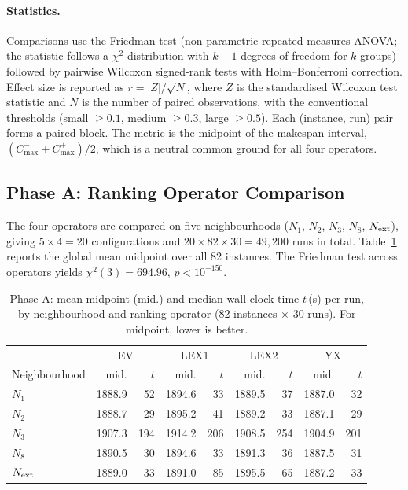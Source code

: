\documentclass[preprint,12pt]{elsarticle}
\begin{document}
\paragraph{Statistics.} Comparisons use the Friedman test (non-parametric repeated-measures ANOVA; the statistic follows a $\chi^2$ distribution with $k-1$ degrees of freedom for $k$ groups) followed by pairwise Wilcoxon signed-rank tests with Holm--Bonferroni correction. Effect size is reported as $r = |Z| / \sqrt{N}$, where $Z$ is the standardised Wilcoxon test statistic and $N$ is the number of paired observations, with the conventional thresholds (small $\geq 0.1$, medium $\geq 0.3$, large $\geq 0.5$). Each (instance, run) pair forms a paired block. The metric is the midpoint of the makespan interval, $(C^-_{\max} + C^+_{\max})/2$, which is a neutral common ground for all four operators.

\subsection{Phase A: Ranking Operator Comparison}
\label{sec6.2}

The four operators are compared on five neighbourhoods ($N_1$, $N_2$, $N_3$, $N_8$, $N_{\rm ext}$), giving $5 \times 4 = 20$ configurations and $20 \times 82 \times 30 = 49{,}200$ runs in total. Table~\ref{tab1} reports the global mean midpoint over all 82 instances. The Friedman test across operators yields $\chi^{2}(3) = 694.96,\, p < 10^{-150}$.

\begin{table}[t]
\centering
\caption{Phase A: mean midpoint (mid.) and median wall-clock time $t$\,(s) per run, by neighbourhood and ranking operator (82 instances $\times$ 30 runs). For midpoint, lower is better.}
\label{tab1}
\small
\begin{tabular}{l rr rr rr rr}
\hline
 & \multicolumn{2}{c}{EV} & \multicolumn{2}{c}{LEX1} & \multicolumn{2}{c}{LEX2} & \multicolumn{2}{c}{YX} \\
Neighbourhood & mid. & $t$ & mid. & $t$ & mid. & $t$ & mid. & $t$ \\
\hline
$N_1$         & 1888.9 &  52 & 1894.6 &  33 & 1889.5 &  37 & 1887.0 &  32 \\
$N_2$         & 1888.7 &  29 & 1895.2 &  41 & 1889.2 &  33 & 1887.1 &  29 \\
$N_3$         & 1907.3 & 194 & 1914.2 & 206 & 1908.5 & 254 & 1904.9 & 201 \\
$N_8$         & 1890.5 &  30 & 1894.6 &  33 & 1891.3 &  36 & 1887.5 &  31 \\
$N_{\rm ext}$ & 1889.0 &  33 & 1891.0 &  85 & 1895.5 &  65 & 1887.2 &  33 \\
\hline
\end{tabular}
\end{table}
\end{document}
